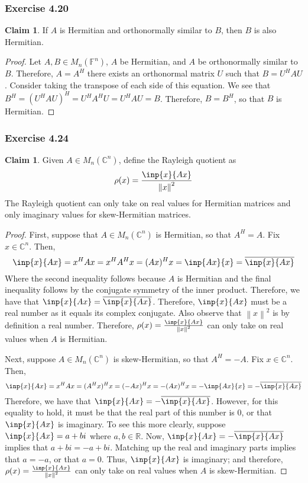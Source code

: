 \documentclass[letterpaper,12pt]{article}
\theoremstyle{definition}
\newtheorem{claim}[theorem]{Claim}
\newcommand{\norm}[1]{\left\lVert#1\right\rVert}
\begin{document}
\subsubsection*{Exercise 4.20}
\begin{claim}
	If $A$ is Hermitian and orthonormally similar to $B$, then $B$ is also Hermitian. 
\end{claim}
\begin{proof}
	Let $A, B \in M_n(\mathbb{F}^n)$, $A$ be Hermitian, and $A$ be orthonormally similar to $B$. Therefore, $A = A^H$ there exists an orthonormal matrix $U$ such that $B = U^H A U$.  Consider taking the transpose of each side of this equation. We see that $B^H = (U^H A U)^H = U^H A^H U = U^H A U = B$. Therefore, $B = B^H$, so that $B$ is Hermitian. 
\end{proof}

\subsubsection*{Exercise 4.24}
\begin{claim}
	Given $A \in M_n(\mathbb{C}^n)$, define the Rayleigh quotient as 
	\begin{equation}
		\rho(x) = \frac{\inp{x}{Ax}}{\norm{x}^2}
	\end{equation}
	The Rayleigh quotient can only take on real values for Hermitian matrices and only imaginary values for skew-Hermitian matrices.
\end{claim}
\begin{proof}
	First, suppose that $A \in M_n(\mathbb{C}^n)$ is Hermitian, so that $A^H = A$. Fix $x \in \mathbb{C}^n$. Then,
	\begin{equation}
		\inp{x}{Ax} = x^HAx = x^HA^Hx = (Ax)^Hx = \inp{Ax}{x} = \overline{\inp{x}{Ax}}
	\end{equation}
	Where the second inequality follows because $A$ is Hermitian and the final inequality follows by the conjugate symmetry of the inner product. Therefore, we have that $\inp{x}{Ax}  = \overline{\inp{x}{Ax}}$. Therefore, $\inp{x}{Ax}$ must be a real number as it equals its complex conjugate. Also observe that $\norm{x}^2$ is by definition a real number. Therefore, $\rho(x) = \frac{\inp{x}{Ax}}{\norm{x}^2}$ can only take on real values when $A$ is Hermitian.
	
	Next, suppose  $A \in M_n(\mathbb{C}^n)$ is skew-Hermitian, so that $A^H = -A$. Fix $x \in \mathbb{C}^n$. Then,
	\begin{equation}
		\inp{x}{Ax} = x^HAx = (A^Hx)^Hx = (-Ax)^Hx =  -(Ax)^Hx = -\inp{Ax}{x} = - \overline{\inp{x}{Ax}}
	\end{equation}
	Therefore, we have that $\inp{x}{Ax} = - \overline{\inp{x}{Ax}}$. However, for this equality to hold, it must be that the real part of this number is $0$, or that $\inp{x}{Ax}$ is imaginary. To see this more clearly, suppose $\inp{x}{Ax} = a + bi$ where $a, b \in \mathbb{R}$. Now, $\inp{x}{Ax} = - \overline{\inp{x}{Ax}}$ implies that $a + bi = -a +bi$. Matching up the real and imaginary parts implies that $a = -a$, or that $a =0$. Thus, $\inp{x}{Ax}$ is imaginary; and therefore, $\rho(x) = \frac{\inp{x}{Ax}}{\norm{x}^2}$ can only take on real values when $A$ is skew-Hermitian.
\end{proof}
\end{document}
